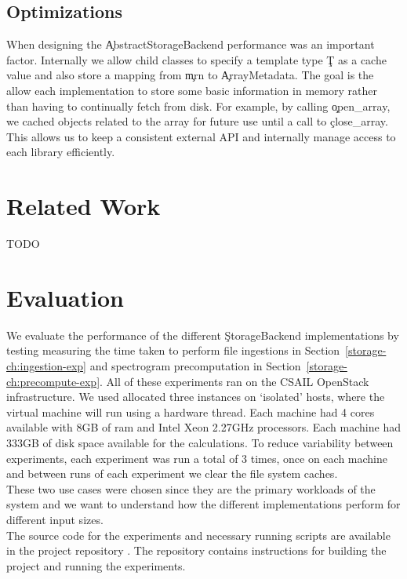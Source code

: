 \subsection{Optimizations}\label{storage-ch:opt}

When designing the \c{AbstractStorageBackend} performance was an important
factor. Internally we allow child classes to specify a template type \c{T} as
a cache value and also store a mapping from \c{mrn} to \c{ArrayMetadata}. The
goal is the allow each implementation to store some basic information in memory
rather than having to continually fetch from disk. For example, by calling 
\c{open\_array}, we cached objects related to the array for future
use until a call to \c{close\_array}. This allows us to keep a consistent
external API and internally manage access to each library efficiently.

\section{Related Work}
TODO

\section{Evaluation}\label{storage-ch:evaluation}

We evaluate the performance of the different \c{StorageBackend} implementations
by testing measuring the time taken to perform file ingestions in
Section~\ref{storage-ch:ingestion-exp} and spectrogram precomputation in
Section~\ref{storage-ch:precompute-exp}. All of these experiments ran on
the CSAIL OpenStack infrastructure. We used allocated three instances on
`isolated' hosts, where the virtual machine will run using a hardware thread.
Each machine had 4 cores available with 8GB of ram and Intel Xeon 2.27GHz
processors. Each machine had 333GB of disk space available for the
calculations. To reduce variability between experiments, each experiment was
run a total of 3 times, once on each machine and between runs of each
experiment we clear the file system caches.\\

These two use cases were chosen since they are the primary workloads of the
system and we want to understand how the different implementations perform for
different input sizes.\\

The source code for the experiments and necessary running scripts are available
in the project repository \cite{eeg-toolkit}. The repository contains
instructions for building the project and running the experiments.

